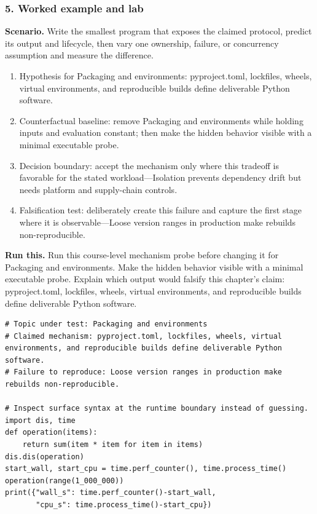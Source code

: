 \subsubsection*{5. Worked example and lab}
\textbf{Scenario.} Write the smallest program that exposes the claimed protocol, predict its output and lifecycle, then vary one ownership, failure, or concurrency assumption and measure the difference.
\begin{enumerate}
\item Hypothesis for Packaging and environments: pyproject.toml, lockfiles, wheels, virtual environments, and reproducible builds define deliverable Python software.
\item Counterfactual baseline: remove Packaging and environments while holding inputs and evaluation constant; then make the hidden behavior visible with a minimal executable probe.
\item Decision boundary: accept the mechanism only where this tradeoff is favorable for the stated workload—Isolation prevents dependency drift but needs platform and supply-chain controls.
\item Falsification test: deliberately create this failure and capture the first stage where it is observable—Loose version ranges in production make rebuilds non-reproducible.
\end{enumerate}
\textbf{Run this.} Run this course-level mechanism probe before changing it for Packaging and environments. Make the hidden behavior visible with a minimal executable probe. Explain which output would falsify this chapter's claim: pyproject.toml, lockfiles, wheels, virtual environments, and reproducible builds define deliverable Python software.
\begin{Verbatim}[fontsize=\scriptsize]
# Topic under test: Packaging and environments
# Claimed mechanism: pyproject.toml, lockfiles, wheels, virtual environments, and reproducible builds define deliverable Python software.
# Failure to reproduce: Loose version ranges in production make rebuilds non-reproducible.

# Inspect surface syntax at the runtime boundary instead of guessing.
import dis, time
def operation(items):
    return sum(item * item for item in items)
dis.dis(operation)
start_wall, start_cpu = time.perf_counter(), time.process_time()
operation(range(1_000_000))
print({"wall_s": time.perf_counter()-start_wall,
       "cpu_s": time.process_time()-start_cpu})
\end{Verbatim}
